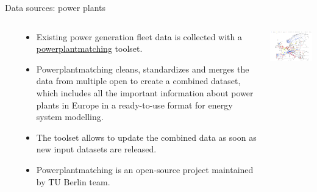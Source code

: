 \begin{frame}{Data sources: power plants}
 
  \begin{columns}[T]\

  \begin{column}{8cm}
    {\small 
    \begin{itemize}
      \item Existing power generation fleet data is collected with a \href{https://github.com/PyPSA/powerplantmatching}{\alert{powerplantmatching}} toolset.
      
      \item Powerplantmatching cleans, standardizes and merges the data from multiple open  to create a combined dataset, which includes all the important information about power plants in Europe in a ready-to-use format for energy system modelling. 
      
      \item The toolset allows to update the combined data as soon as new input datasets are released.
  
      \item Powerplantmatching is an open-source project maintained by TU Berlin team. \\
      \faGithub~ \\
      \faBook~
    
    \end{itemize}
    }  
  \end{column}

  \begin{column}{7cm}
  \vspace{0.5cm}
  \centering
  \includegraphics[width=7.2cm]{images/powerplantmatching.png}
  \end{column}

  \end{columns}

\end{frame}




